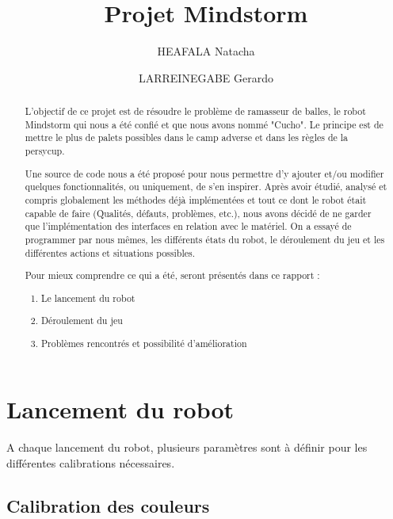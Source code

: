 \documentclass[preprint,12pt]{elsarticle}
\begin{document}
\begin{frontmatter}


\title{Projet Mindstorm}



\author{HEAFALA Natacha}
\author{LARREINEGABE Gerardo}


\begin{abstract}
L'objectif de ce projet est de résoudre le problème de ramasseur de balles, le robot Mindstorm qui nous a été confié et que nous avons nommé "Cucho". Le principe est de mettre le plus de palets possibles dans le camp adverse et dans les règles de la persycup.

Une source de code nous a été proposé pour nous permettre d'y ajouter et/ou modifier quelques fonctionnalités, ou uniquement, de s'en inspirer. Après avoir étudié, analysé et compris globalement les méthodes déjà implémentées et tout ce dont le robot était capable de faire (Qualités, défauts, problèmes, etc.), nous avons décidé de ne garder que l'implémentation des interfaces en relation avec le matériel. On a essayé de programmer par nous mêmes, les différents états du robot, le déroulement du jeu et les différentes actions et situations possibles.

Pour mieux comprendre ce qui a été, seront présentés dans ce rapport :
\begin{enumerate}
\item Le lancement du robot
\item Déroulement du jeu
\item Problèmes rencontrés et possibilité d'amélioration
\end{enumerate}

\end{abstract}

\end{frontmatter}

\section{Lancement du robot}
\label{S:1}

A chaque lancement du robot, plusieurs paramètres sont à définir pour les différentes calibrations nécessaires.  

\subsection{Calibration des couleurs}
\end{document}
